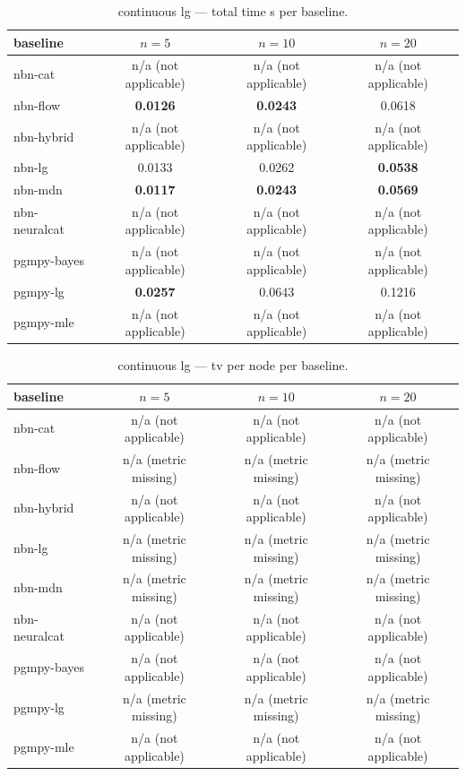 
\begin{table}[h]
\centering
\caption{continuous lg — total time s per baseline.}
\label{tab:continuous_lg_total_time_s}
\begin{tabular}{lccc}
\toprule
baseline & $n=5$ & $n=10$ & $n=20$ \\
\midrule
nbn-cat & n/a (not applicable) & n/a (not applicable) & n/a (not applicable) \\
nbn-flow & \textbf{0.0126} & \textbf{0.0243} & 0.0618 \\
nbn-hybrid & n/a (not applicable) & n/a (not applicable) & n/a (not applicable) \\
nbn-lg & 0.0133 & 0.0262 & \textbf{0.0538} \\
nbn-mdn & \textbf{0.0117} & \textbf{0.0243} & \textbf{0.0569} \\
nbn-neuralcat & n/a (not applicable) & n/a (not applicable) & n/a (not applicable) \\
pgmpy-bayes & n/a (not applicable) & n/a (not applicable) & n/a (not applicable) \\
pgmpy-lg & \textbf{0.0257} & 0.0643 & 0.1216 \\
pgmpy-mle & n/a (not applicable) & n/a (not applicable) & n/a (not applicable) \\
\bottomrule
\end{tabular}
\end{table}

\begin{table}[h]
\centering
\caption{continuous lg — tv per node per baseline.}
\label{tab:continuous_lg_tv_per_node}
\begin{tabular}{lccc}
\toprule
baseline & $n=5$ & $n=10$ & $n=20$ \\
\midrule
nbn-cat & n/a (not applicable) & n/a (not applicable) & n/a (not applicable) \\
nbn-flow & n/a (metric missing) & n/a (metric missing) & n/a (metric missing) \\
nbn-hybrid & n/a (not applicable) & n/a (not applicable) & n/a (not applicable) \\
nbn-lg & n/a (metric missing) & n/a (metric missing) & n/a (metric missing) \\
nbn-mdn & n/a (metric missing) & n/a (metric missing) & n/a (metric missing) \\
nbn-neuralcat & n/a (not applicable) & n/a (not applicable) & n/a (not applicable) \\
pgmpy-bayes & n/a (not applicable) & n/a (not applicable) & n/a (not applicable) \\
pgmpy-lg & n/a (metric missing) & n/a (metric missing) & n/a (metric missing) \\
pgmpy-mle & n/a (not applicable) & n/a (not applicable) & n/a (not applicable) \\
\bottomrule
\end{tabular}
\end{table}

